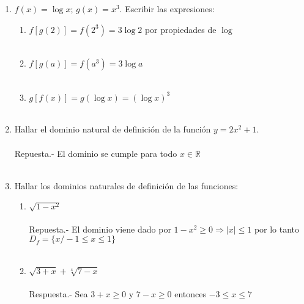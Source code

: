 \begin{enumerate}
    \item $f(x)=\log x$; $g(x)=x^3$. Escribir las expresiones:\\
	
    \begin{enumerate}[\bfseries a)]
	
	\item $f\left[g(2)\right] = f(2^3) = 3 \log 2$ por propiedades de $\log$\\\\

	\item $f\left[g(a)\right] = f(a^3) = 3\log a$\\\\

	\item $g\left[f(x)\right] = g(\log x) = (\log x)^3$\\\\

    \end{enumerate}

    \item Hallar el dominio natural de definición de la función $y=2x^2 + 1$.\\\\
	Repuesta.-\; El dominio se cumple para todo $x \in \mathbb{R}$\\\\ 

    \item Hallar los dominios naturales de definición de las funciones:
    \begin{enumerate}[\bfseries a)]
	
	\item $\sqrt{1-x^2}$\\\\
	    Repuesta.-\; El dominio viene dado por $1-x^2 \geq 0 \Longrightarrow |x| \leq 1$ por lo tanto $D_f=\lbrace x / -1\leq x \leq 1 \rbrace$\\\\

	\item $\sqrt{3+x} + \sqrt[4]{7-x}$\\\\
	    Respuesta.-\; Sea $3+x\geq 0$ y $7-x\geq 0$ entonces $-3\leq x \leq 7$\\\\


\end{enumerate}
\end{enumerate}
